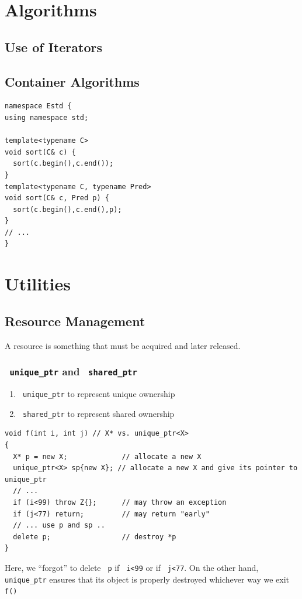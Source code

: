 \documentclass[11pt]{article}
\let\OldTexttt\texttt
\renewcommand{\texttt}[1]{\OldTexttt{\color{MidnightBlue} #1}}
\begin{document}
\section{Algorithms}
\label{sec:orgd35187a}
\subsection{Use of Iterators}
\label{sec:org62f80ce}
\subsection{Container Algorithms}
\label{sec:orgadcba45}
\label{12.8}
\begin{verbatim}
namespace Estd {
using namespace std;

template<typename C>
void sort(C& c) {
  sort(c.begin(),c.end());
}
template<typename C, typename Pred>
void sort(C& c, Pred p) {
  sort(c.begin(),c.end(),p);
}
// ...
}
\end{verbatim}
\section{Utilities}
\label{sec:org2488399}
\subsection{Resource Management}
\label{sec:orga31e68c}
A resource is something that must be acquired and later released.
\subsubsection{\texttt{unique\_ptr} and \texttt{shared\_ptr}}
\label{sec:org947e87d}
\begin{enumerate}
\item \texttt{unique\_ptr} to represent unique ownership
\item \texttt{shared\_ptr} to represent shared ownership
\end{enumerate}
\begin{verbatim}
void f(int i, int j) // X* vs. unique_ptr<X>
{
  X* p = new X;             // allocate a new X
  unique_ptr<X> sp{new X}; // allocate a new X and give its pointer to unique_ptr
  // ...
  if (i<99) throw Z{};      // may throw an exception
  if (j<77) return;         // may return "early"
  // ... use p and sp ..
  delete p;                 // destroy *p
}
\end{verbatim}
Here, we ``forgot'' to delete \texttt{p} if \texttt{i<99} or if \texttt{j<77}. On the other hand, \texttt{unique\_ptr} ensures that its
object is properly destroyed whichever way we exit \texttt{f()}
\end{document}
